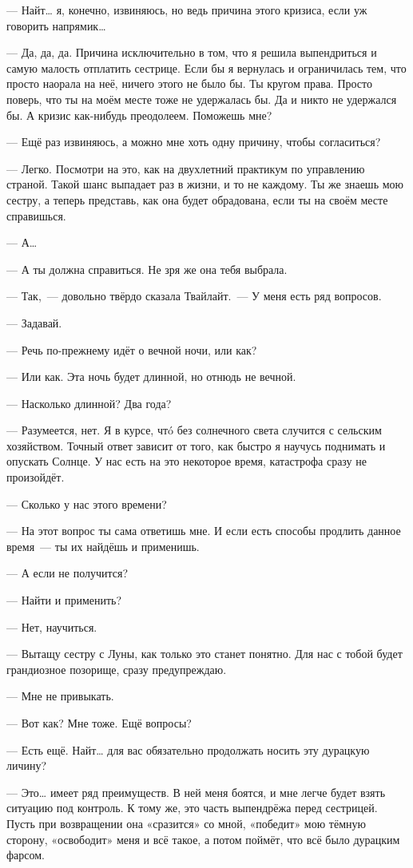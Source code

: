 \documentclass[twoside,a5paper,12pt]{extbook}
\begin{document}
— Найт… я, конечно, извиняюсь, но ведь причина этого кризиса, если уж говорить напрямик…

— Да, да, да. Причина исключительно в том, что я решила выпендриться и самую малость отплатить сестрице. Если бы я вернулась и ограничилась тем, что просто наорала на неё, ничего этого не было бы. Ты кругом права. Просто поверь, что ты на моём месте тоже не удержалась бы. Да и никто не удержался бы. А кризис как-нибудь преодолеем. Поможешь мне?

— Ещё раз извиняюсь, а можно мне хоть одну причину, чтобы согласиться?

— Легко. Посмотри на это, как на двухлетний практикум по управлению страной. Такой шанс выпадает раз в жизни, и то не каждому. Ты же знаешь мою сестру, а теперь представь, как она будет обрадована, если ты на своём месте справишься.

— А…

— А ты должна справиться. Не зря же она тебя выбрала.

— Так, — довольно твёрдо сказала Твайлайт. — У меня есть ряд вопросов.

— Задавай.

— Речь по-прежнему идёт о вечной ночи, или как?

— Или как. Эта ночь будет длинной, но отнюдь не вечной.

— Насколько длинной? Два года?

— Разумеется, нет. Я в курсе, чтó без солнечного света случится с сельским хозяйством. Точный ответ зависит от того, как быстро я научусь поднимать и опускать Солнце. У нас есть на это некоторое время, катастрофа сразу не произойдёт.

— Сколько у нас этого времени?

— На этот вопрос ты сама ответишь мне. И если есть способы продлить данное время — ты их найдёшь и применишь.

— А если не получится?

— Найти и применить?

— Нет, научиться.

— Вытащу сестру с Луны, как только это станет понятно. Для нас с тобой будет грандиозное позорище, сразу предупреждаю.

— Мне не привыкать.

— Вот как? Мне тоже. Ещё вопросы?

— Есть ещё. Найт… для вас обязательно продолжать носить эту дурацкую личину?

— Это… имеет ряд преимуществ. В ней меня боятся, и мне легче будет взять ситуацию под контроль. К тому же, это часть выпендрёжа перед сестрицей. Пусть при возвращении она «сразится» со мной, «победит» мою тёмную сторону, «освободит» меня и всё такое, а потом поймёт, что всё было дурацким фарсом.
\end{document}
